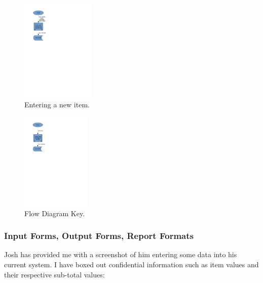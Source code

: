 \begin{figure}[H]
    \centerline{\includegraphics[width=130px]{./Analysis/Dataflow/DFD_analysis_new_item.pdf}}
    \caption{Entering a new item.} \label{fig:print_function_result}
\end{figure}

\begin{figure}[H]
    \centerline{\includegraphics[width=125px]{./Analysis/Dataflow/DFD_analysis_update_item.pdf}}
    \caption{Flow Diagram Key.} \label{fig:print_function_result}
\end{figure}

\newpage

\subsubsection{Input Forms, Output Forms, Report Formats}

Josh has provided me with a screenshot of him entering some data into his current system. I have boxed out confidential information such as item values and their respective sub-total values:\\

